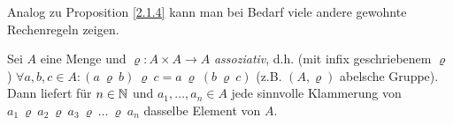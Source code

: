 \documentclass[../../main.tex]{subfiles}
\begin{document}
\begin{bem}\label{2.1.5}
Analog zu Proposition \ref{2.1.4} kann man bei Bedarf viele andere gewohnte Rechenregeln zeigen.
\end{bem}


\begin{sat}\label{2.1.6}
Sei $A$ eine Menge und $\varrho : A\times A \rightarrow A$ \emph{assoziativ}, d.h. (mit infix geschriebenem $\varrho$) $\forall a,b,c\in A: (a~\varrho~ b)~\varrho~ c = a ~\varrho~ (b~\varrho~ c)$ (z.B. $(A,\varrho)$ abelsche Gruppe). Dann liefert für $n\in\mathbb N$ und $a_1,\ldots,a_n\in A$ jede sinnvolle Klammerung von $a_1~\varrho~ a_2~\varrho~ a_3~\varrho~\ldots~\varrho~ a_n$ dasselbe Element von $A$.
\end{sat}
\end{document}
